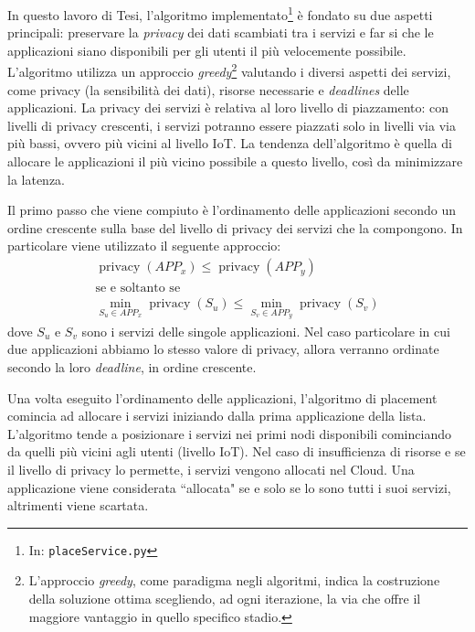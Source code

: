 In questo lavoro di Tesi, l'algoritmo implementato\footnote{In: \texttt{placeService.py}} è fondato su due aspetti principali: preservare la \textit{privacy} dei dati scambiati tra i servizi e far si che le applicazioni siano disponibili per gli utenti il più velocemente possibile. L'algoritmo utilizza un approccio \textit{greedy}\footnote{L'approccio \textit{greedy}, come paradigma negli algoritmi, indica la costruzione della soluzione ottima scegliendo, ad ogni iterazione, la via che offre il maggiore vantaggio in quello specifico stadio. } valutando i diversi aspetti dei servizi, come privacy (la sensibilità dei dati), risorse necessarie e \textit{deadlines} delle applicazioni. La privacy dei servizi è relativa al loro livello di piazzamento: con livelli di privacy crescenti, i servizi potranno essere piazzati solo in livelli via via più bassi, ovvero più vicini al livello IoT. La tendenza dell'algoritmo è quella di allocare le applicazioni il più vicino possibile a questo livello, così da minimizzare la latenza.

Il primo passo che viene compiuto è l'ordinamento delle applicazioni secondo un ordine crescente sulla base del livello di privacy dei servizi che la compongono. In particolare viene utilizzato il seguente approccio:
\begin{equation*}  
	\begin{array}{c}

\displaystyle \operatorname{privacy}(APP_x) \leq \operatorname{privacy}(APP_y)\\
\text{se e soltanto se}\\
\displaystyle \min_{S_u \in APP_x} \operatorname{privacy}(S_u) \leq \min_{S_v \in APP_y} \operatorname{privacy}(S_v)
 	\end{array}
\end{equation*}
dove $S_u$ e $S_v$ sono i servizi delle singole applicazioni. Nel caso particolare in cui due applicazioni abbiamo lo stesso valore di privacy, allora verranno ordinate secondo la loro \textit{deadline}, in ordine crescente.

Una volta eseguito l'ordinamento delle applicazioni, l'algoritmo di placement comincia ad allocare i servizi iniziando dalla prima applicazione della lista. L'algoritmo tende a posizionare i servizi nei primi nodi disponibili cominciando da quelli più vicini agli utenti (livello IoT). Nel caso di insufficienza di risorse e se il livello di privacy lo permette, i servizi vengono allocati nel Cloud. Una applicazione viene considerata ``allocata" se e solo se lo sono tutti i suoi servizi, altrimenti viene scartata.

